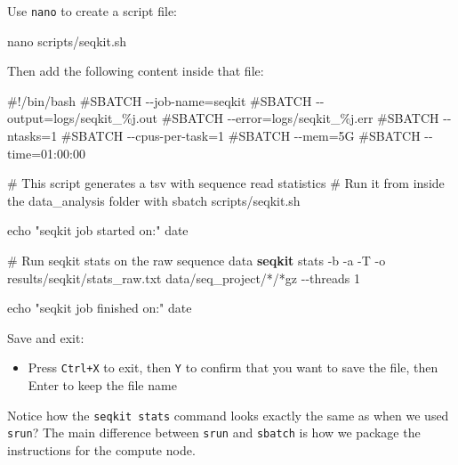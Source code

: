 \documentclass[
  letterpaper,
  DIV=11,
  numbers=noendperiod]{scrreprt}
\newenvironment{Shaded}{}{}
\newcommand{\AttributeTok}[1]{\textcolor[rgb]{0.84,0.23,0.29}{#1}}
\newcommand{\BuiltInTok}[1]{\textcolor[rgb]{0.84,0.23,0.29}{#1}}
\newcommand{\CommentTok}[1]{\textcolor[rgb]{0.42,0.45,0.49}{#1}}
\newcommand{\ExtensionTok}[1]{\textcolor[rgb]{0.84,0.23,0.29}{\textbf{#1}}}
\newcommand{\FunctionTok}[1]{\textcolor[rgb]{0.44,0.26,0.76}{#1}}
\newcommand{\NormalTok}[1]{\textcolor[rgb]{0.14,0.16,0.18}{#1}}
\newcommand{\PreprocessorTok}[1]{\textcolor[rgb]{0.84,0.23,0.29}{#1}}
\newcommand{\StringTok}[1]{\textcolor[rgb]{0.01,0.18,0.38}{#1}}
\providecommand{\tightlist}{%
  \setlength{\itemsep}{0pt}\setlength{\parskip}{0pt}}
\begin{document}
Use \texttt{nano} to create a script file:

\begin{Shaded}
\begin{Highlighting}[]
\FunctionTok{nano}\NormalTok{ scripts/seqkit.sh}
\end{Highlighting}
\end{Shaded}

Then add the following content inside that file:

\begin{Shaded}
\begin{Highlighting}[]
\CommentTok{\#!/bin/bash}
\CommentTok{\#SBATCH {-}{-}job{-}name=seqkit}
\CommentTok{\#SBATCH {-}{-}output=logs/seqkit\_\%j.out}
\CommentTok{\#SBATCH {-}{-}error=logs/seqkit\_\%j.err}
\CommentTok{\#SBATCH {-}{-}ntasks=1}
\CommentTok{\#SBATCH {-}{-}cpus{-}per{-}task=1}
\CommentTok{\#SBATCH {-}{-}mem=5G}
\CommentTok{\#SBATCH {-}{-}time=01:00:00}

\CommentTok{\# This script generates a tsv with sequence read statistics}
\CommentTok{\# Run it from inside the data\_analysis folder with \textasciigrave{}sbatch scripts/seqkit.sh\textasciigrave{}}

\BuiltInTok{echo} \StringTok{"seqkit job started on:"}
\FunctionTok{date}

\CommentTok{\# Run seqkit stats on the raw sequence data}
\ExtensionTok{seqkit}\NormalTok{ stats }\AttributeTok{{-}b} \AttributeTok{{-}a} \AttributeTok{{-}T} \AttributeTok{{-}o}\NormalTok{ results/seqkit/stats\_raw.txt data/seq\_project/}\PreprocessorTok{*}\NormalTok{/}\PreprocessorTok{*}\NormalTok{gz }\AttributeTok{{-}{-}threads}\NormalTok{ 1}

\BuiltInTok{echo} \StringTok{"seqkit job finished on:"}
\FunctionTok{date}
\end{Highlighting}
\end{Shaded}

Save and exit:

\begin{itemize}
\tightlist
\item
  Press \texttt{Ctrl+X} to exit, then \texttt{Y} to confirm that you
  want to save the file, then Enter to keep the file name
\end{itemize}

Notice how the \texttt{seqkit\ stats} command looks exactly the same as
when we used \texttt{srun}? The main difference between \texttt{srun}
and \texttt{sbatch} is how we package the instructions for the compute
node.
\end{document}
